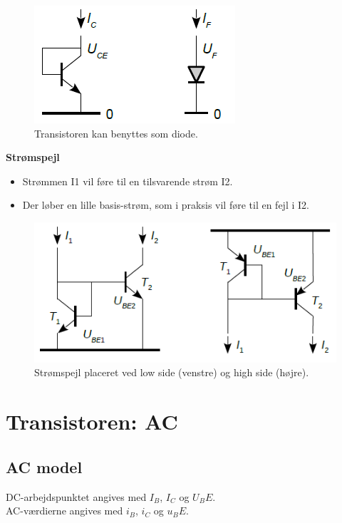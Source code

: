 \documentclass[danish]{article}
\begin{document}
\begin{figure} [H]
	\centering
	\includegraphics[width=0.6\linewidth]{graphics/diodekobling}
	\caption{Transistoren kan benyttes som diode.}
	\label{fig:diodekobling}
\end{figure}

\textbf{Strømspejl}
\begin{itemize}
	\item Strømmen I1 vil føre til en tilsvarende strøm I2.
	\item Der løber en lille basis-strøm, som i praksis vil føre til en fejl i I2.
\end{itemize}

\begin{figure} [H]
	\centering
	\includegraphics[width=0.8\linewidth]{graphics/currentmirror}
	\caption{Strømspejl placeret ved low side (venstre) og high side (højre).}
	\label{fig:currentmirror}
\end{figure}


\newpage
\section{Transistoren: AC}
\subsection{AC model}

DC-arbejdspunktet angives med $I_B$, $I_C$ og $U_BE$.\\

AC-værdierne angives med $i_B$, $i_C$ og $u_BE$.
\end{document}
